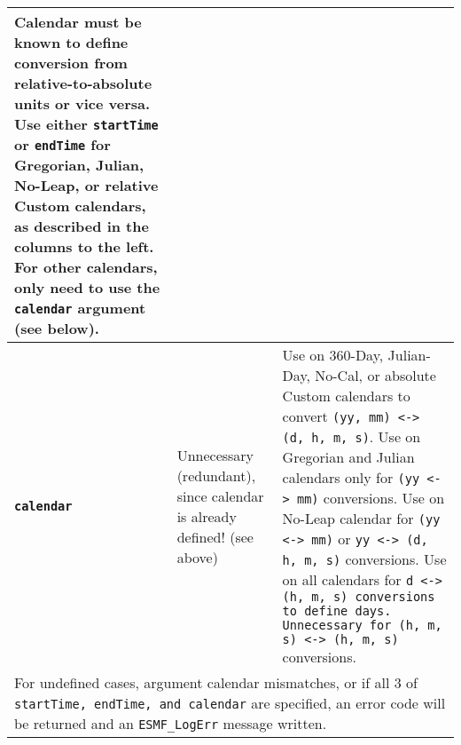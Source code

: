 \begin{center}
\begin{table}
\begin{tabular}{|p{1.5in}|p{1.25in}|p{1.25in}|p{1.25in}|p{1.25in}|p{1.25in}|}
  Calendar must be known to define conversion from relative-to-absolute units or vice versa.  Use either {\tt startTime} or {\tt endTime} for Gregorian, Julian, No-Leap, or relative Custom calendars, as described in the columns to the left.  For other calendars, only need to use the {\tt calendar} argument (see below). \\
\hline

{\bf {\tt calendar}} &
  \multicolumn{4}{l}{Unnecessary (redundant), since calendar is already defined! (see above)} &

  Use on 360-Day, Julian-Day, No-Cal, or absolute Custom calendars to convert {\tt (yy, mm) <-> (d, h, m, s)}.  Use on Gregorian and Julian calendars only for {\tt (yy <-> mm)} conversions.  Use on No-Leap calendar for {\tt (yy <-> mm)} or {\tt yy <-> (d, h, m, s)} conversions.  Use on all calendars for {\tt d <-> {\tt (h, m, s)} conversions to define days.  Unnecessary for {\tt (h, m, s)} <-> (h, m, s)} conversions.  \\
\hline

  \multicolumn{6}{l}{For undefined cases, argument calendar mismatches, or if all 3 of {\tt startTime, endTime, and calendar} are specified, an error code will be returned and an {\tt ESMF\_LogErr} message written.} \\
\hline

\end{tabular}
\end{table}
\end{center}
